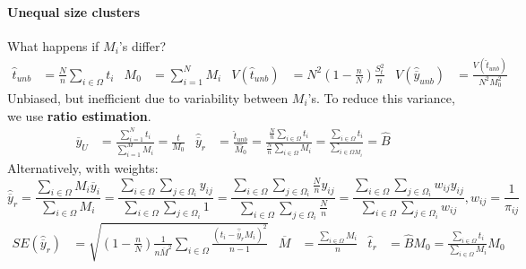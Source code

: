 \documentclass[landscape]{article}
\begin{document}
\begin{multicols*}{3}
\paragraph{Unequal size clusters} What happens if $M_i$'s differ?
\begin{align*}
  \hat{t}_{unb} & = \frac{N}{n} \sum_{i \in \Omega} t_i
  & M_0 & = \sum_{i=1}^N M_i
  & V (\hat{t}_{unb}) & = N^2 {\left(1 - \frac{n}{N}\right)\frac{S_t^2}{n}}
  & V(\hat{\overline{y}}_{unb}) & = \frac{V(\hat{t}_{unb})}{N^2M_0^2}
\end{align*}
Unbiased, but inefficient due to variability between $M_i$'s. To
reduce this variance, we use \textbf{ratio estimation}.
\begin{align*}
  \overline{y}_U & = \frac{\sum_{i=1}^N t_i}{\sum_{i=1}^M M_i} = \frac{t }{M_0}
  & \hat{\overline{y}}_r & = \frac{\hat{t}_{unb}}{\hat{M}_0} = \frac{\frac{N}{n}\sum_{i \in \Omega}t_i}{\frac{N}{n}\sum_{i \in \Omega}M_i} = \frac{\sum_{i \in \Omega}t_i}{\sum_{i \in \Omega M_i}} = \hat{B}
\end{align*}
{Alternatively, with weights:}
$$\hat{\overline{y}}_r = \frac{\sum_{i \in \Omega}M_i \overline{y}_i}{\sum_{i \in \Omega}M_i} = \frac{\sum_{i \in \Omega} \sum_{j \in \Omega_i} y_{ij}}{\sum_{i \in \Omega}\sum_{j \in \Omega_i} 1} = \frac{\sum_{i \in \Omega}\sum_{j \in \Omega_i} \frac{N}{n}y_{ij}}{\sum_{i \in \Omega}\sum_{j \in \Omega_i} \frac{N}{n}} = \frac{\sum_{i \in \Omega} \sum_{j \in \Omega_i} w_{ij}y_{ij}}{\sum_{i \in \Omega} \sum_{j \in \Omega_i}w_{ij}}, w_{ij} = \frac{1}{\pi_{ij}}$$
\begin{align*}
   SE(\hat{\overline{y}}_r) & = \sqrt{\left(1 - \frac{n}{N}\right)\frac{1}{n \overline{M}^2} \sum_{i \in \Omega} \frac{(t_i - \hat{\overline{y}}_rM_i)^2}{n-1}}
  & \overline{M} & = \frac{\sum_{i \in \Omega}M_i}{n}
  & \hat{t}_r & = \hat{B}M_0 = \frac{\sum_{i \in \Omega}t_i}{\sum_{i \in \Omega}M_i}M_0
\end{align*}

\end{multicols*}
\end{document}
